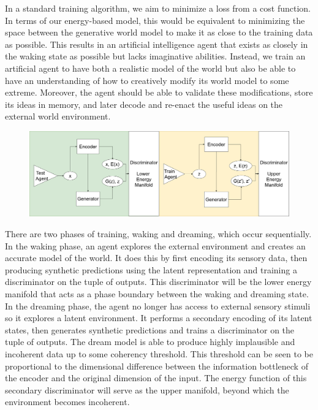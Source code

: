 \documentclass{article}
\begin{document}
In a standard training algorithm, we aim to minimize a loss from a cost function. In terms of our energy-based model, this would be equivalent to minimizing the space between the generative world model to make it as close to the training data as possible. This results in an artificial intelligence agent that exists as closely in the waking state as possible but lacks imaginative abilities. Instead, we train an artificial agent to have both a realistic model of the world but also be able to have an understanding of how to creatively modify its world model to some extreme. Moreover, the agent should be able to validate these modifications, store its ideas in memory, and later decode and re-enact the useful ideas on the external world environment. 
\begin{figure}[H]
    \centering
    \includegraphics[width=13.9cm]{dream-model-v2.png}
\end{figure}

There are two phases of training, waking and dreaming, which occur sequentially. In the waking phase, an agent explores the external environment and creates an accurate model of the world. It does this by first encoding its sensory data, then producing synthetic predictions using the latent representation and training a discriminator on the tuple of outputs. This discriminator will be the lower energy manifold that acts as a phase boundary between the waking and dreaming state.  In the dreaming phase, the agent no longer has access to external sensory stimuli so it explores a latent environment. It performs a secondary encoding of its latent states, then generates synthetic predictions and trains a discriminator on the tuple of outputs. The dream model is able to produce highly implausible and incoherent data up to some coherency threshold. This threshold can be seen to be proportional to the dimensional difference between the information bottleneck of the encoder and the original dimension of the input. The energy function of this secondary discriminator will serve as the upper manifold, beyond which the environment becomes incoherent.
\end{document}
